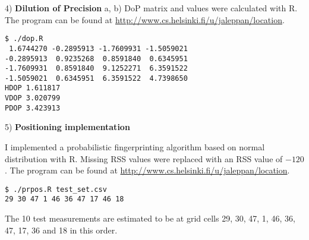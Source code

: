 \documentclass[a4paper,parskip=full]{scrartcl}
\begin{document}
4) \textbf{Dilution of Precision}
a, b) DoP matrix and values were calculated with R. The program can be found at
\url{http://www.cs.helsinki.fi/u/jaleppan/location}.
\begin{verbatim}
$ ./dop.R
 1.6744270 -0.2895913 -1.7609931 -1.5059021
-0.2895913  0.9235268  0.8591840  0.6345951
-1.7609931  0.8591840  9.1252271  6.3591522
-1.5059021  0.6345951  6.3591522  4.7398650
HDOP 1.611817
VDOP 3.020799
PDOP 3.423913
\end{verbatim}

5) \textbf{Positioning implementation}

I implemented a probabilistic fingerprinting algorithm based on normal
distribution with R. Missing RSS values were replaced with an RSS value of $-120$.
The program can be found at \url{http://www.cs.helsinki.fi/u/jaleppan/location}.
\begin{verbatim}
$ ./prpos.R test_set.csv 
29 30 47 1 46 36 47 17 46 18
\end{verbatim}
The 10 test measurements are estimated to be at grid cells 29, 30, 47, 1, 46,
36, 47, 17, 36 and 18 in this order.

%
%
\end{document}
